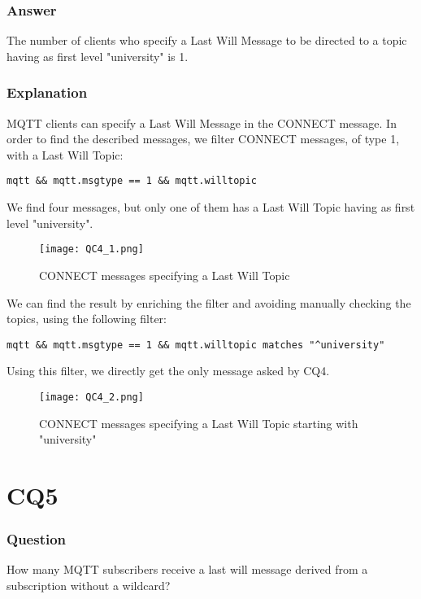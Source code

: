 \subsubsection{Answer}
The number of clients who specify a Last Will Message to be directed to a topic having as first level "university" is 1.

\subsubsection{Explanation}
MQTT clients can specify a Last Will Message in the CONNECT message. In order to find the described messages, we filter CONNECT messages, of type 1, with a Last Will Topic:
\begin{verbatim}
mqtt && mqtt.msgtype == 1 && mqtt.willtopic
\end{verbatim}
We find four messages, but only one of them has a Last Will Topic having as first level "university".\\

\begin{figure}[H]
    \centering
    \texttt{[image: QC4\_1.png]}
    \caption{CONNECT messages specifying a Last Will Topic}
\end{figure}

We can find the result by enriching the filter and avoiding manually checking the topics, using the following filter:
\begin{verbatim}
mqtt && mqtt.msgtype == 1 && mqtt.willtopic matches "^university"
\end{verbatim}
Using this filter, we directly get the only message asked by CQ4.

\begin{figure}[H]
    \centering
    \texttt{[image: QC4\_2.png]}
    \caption{CONNECT messages specifying a Last Will Topic starting with "university"}
\end{figure}

\section{CQ5}
\subsubsection{Question}
How many MQTT subscribers receive a last will message derived from a subscription without a wildcard?

